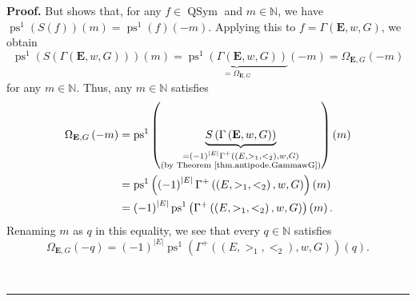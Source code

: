 \documentclass[numbers=enddot,12pt,final,onecolumn,notitlepage,abstracton]{scrartcl}
\theoremstyle{definition}
\newenvironment{proof}[1][Proof]{\noindent\textbf{#1.} }{\ \rule{0.5em}{0.5em}}
\newcommand{\QSym}{{\operatorname{QSym}}}
\newcommand{\EE}{{\mathbf{E}}}
\newcommand{\NN}{{\mathbb{N}}}
\begin{document}
\begin{proof}
But \cite[Proposition 7.1.7 (iii)]{Reiner} shows that, for any
$f \in \QSym$ and $m \in \NN$, we have
$\operatorname{ps}^{1}\left(  S\left(  f\right)  \right)
\left(  m\right)
=\operatorname{ps}^{1}\left(  f\right)  \left(  -m\right)  $.
Applying this to $f=\Gamma\left(   \EE ,w,G\right)  $, we obtain
\[
\operatorname{ps}^{1}\left(  S\left(  \Gamma\left(  {\mathbf{E}%
},w,G\right)  \right)  \right)  \left(  m\right)
=\underbrace{\operatorname{ps}^{1}\left(  \Gamma\left(  {\mathbf{E}%
},w,G\right)  \right)  }_{=\Omega_{\mathbf{E},G}}\left(  -m\right)
=\Omega_{\mathbf{E},G}\left(  -m\right)
\]
for any $m\in \NN $. Thus, any $m\in \NN $ satisfies
\begin{align*}
\Omega_{\mathbf{E},G}\left(  -m\right)   &  =\operatorname{ps}^{1}%
\left(  \underbrace{S\left(  \Gamma\left(  \EE ,w,G\right)  \right)
}_{\substack{=\left(  -1\right)  ^{\left\vert E\right\vert }\Gamma^{+}\left(
\left(  E,>_{1},<_{2}\right)  ,w,G\right)  \\\text{(by Theorem
\ref{thm.antipode.GammawG})}}}\right)  \left(  m\right) \\
&  =\operatorname{ps}^{1}\left(  \left(  -1\right)  ^{\left\vert
E\right\vert }\Gamma^{+}\left(  \left(  E,>_{1},<_{2}\right)  ,w,G\right)
\right)  \left(  m\right) \\
&  =\left(  -1\right)  ^{\left\vert E\right\vert }
\operatorname{ps}^{1}
\left(  \Gamma^{+}\left(  \left(  E,>_{1},<_{2}\right)
,w,G\right)  \right)  \left(  m\right)  .
\end{align*}
Renaming $m$ as $q$ in this equality, we see that every $q\in \NN $
satisfies
\begin{equation}
\Omega_{\mathbf{E},G}\left(  -q\right)  =\left(  -1\right)  ^{\left\vert
E\right\vert }\operatorname{ps}^{1}\left(  \Gamma^{+}\left(  \left(
E,>_{1},<_{2}\right)  ,w,G\right)  \right)  \left(  q\right)  .
\label{pf.cor.reciprocity.GammawG.b.2}
\end{equation}



\end{proof}
\end{document}
